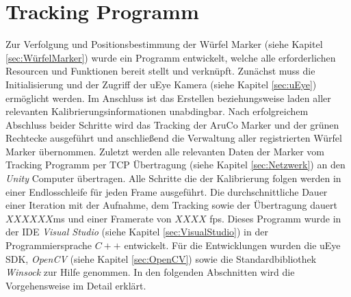 \section{Tracking Programm} \label{sec:Tracking}
Zur Verfolgung und Positionsbestimmung der Würfel Marker (siehe Kapitel \ref{sec:WürfelMarker}) wurde ein Programm entwickelt, welche alle erforderlichen Resourcen und Funktionen bereit stellt und verknüpft. Zunächst muss die Initialisierung und der Zugriff der uEye Kamera (siehe Kapitel \ref{sec:uEye}) ermöglicht werden. Im Anschluss ist das Erstellen beziehungsweise laden aller relevanten Kalibrierungsinformationen unabdingbar. Nach erfolgreichem Abschluss beider Schritte wird das Tracking der AruCo Marker und der grünen Rechtecke ausgeführt und anschließend die Verwaltung aller registrierten Würfel Marker übernommen. Zuletzt werden alle relevanten Daten der Marker vom Tracking Programm per TCP Übertragung (siehe Kapitel \ref{sec:Netzwerk}) an den \textit{Unity} Computer übertragen. Alle Schritte die der Kalibrierung folgen werden in einer Endlosschleife für jeden Frame ausgeführt. Die durchschnittliche Dauer einer Iteration mit der Aufnahme, dem Tracking sowie der Übertragung dauert $XXXXXX$ms und einer Framerate von $XXXX$ fps. 
Dieses Programm wurde in der IDE \textit{Visual Studio} (siehe Kapitel \ref{sec:VisualStudio}) in der Programmiersprache $C++$ entwickelt. Für die Entwicklungen wurden die uEye SDK, \textit{OpenCV} (siehe Kapitel \ref{sec:OpenCV}) sowie die Standardbibliothek \textit{Winsock} zur Hilfe genommen. In den folgenden Abschnitten wird die Vorgehensweise im Detail erklärt.

